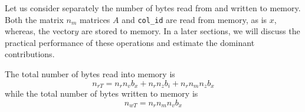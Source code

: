 \documentclass[10pt,conference,compsocconf]{IEEEtran}
\def\blue#1{\textbf{\textcolor{blue}{#1}}}
\def\qes#1{{\blue{*** For Erik: #1 ***}}}
\def\ttt#1{{\tt #1}}
\def\qes#1{}
\begin{document}
Let us consider separately the number of bytes read from and written to memory.
Both the matrix $n_m$ matrices $A$ \qes{need an index on $A$ since there are more than one?} and \ttt{col\_id} are read from memory, as is $x$, whereas, the vector$y$ are stored to memory. In a later sections, we will discuss the practical performance of these operations and estimate the dominant contributions. 
\qes{We also wish to isolate the effects of read, write and compute operations as a function of the number of cores and threads to see how they influence the results and to estimate whether our results have the potential to scale similarly on systems with a higher number of cores. We "might" also compare are results against the best implementation using OpenCL, or do so in the paper.}

The total number of bytes read into memory is
$$ 
n_{rT} = n_r n_v b_x + n_r n_z b_i + n_r n_m n_z b_x
$$
while the total number of bytes written to memory is
$$
n_{wT} = n_r n_m n_v b_x
$$
\end{document}
